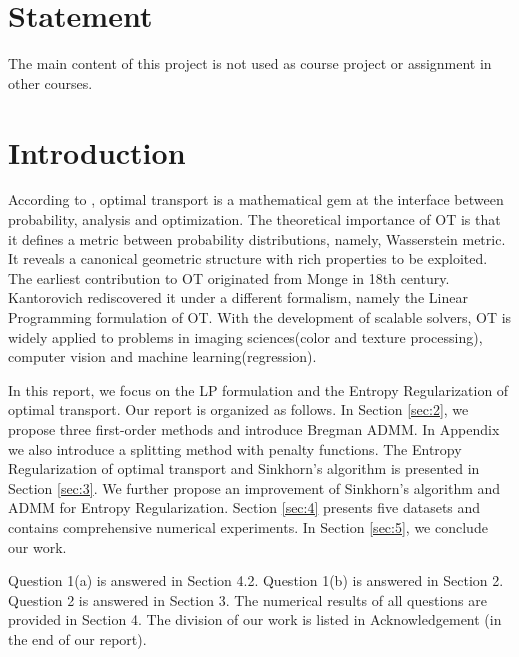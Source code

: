 \documentclass[english]{pkupaper}
\title{\titlemark}
\author{\authorthing}
\date{}
\begin{document}
\maketitle
\section*{Statement}
The main content of this project is not used as course project or assignment in other courses.

\section{Introduction}
According to \cite{COT}, optimal transport is a mathematical gem at the interface between probability, analysis and optimization. The theoretical importance of OT is that it defines a metric between probability distributions, namely, Wasserstein metric. It reveals a canonical geometric structure with rich properties to be exploited.  The earliest contribution to OT originated from Monge in 18th century. Kantorovich rediscovered it under a different formalism, namely the Linear Programming formulation of OT. With the development of scalable solvers, OT is widely applied to problems in imaging sciences(color and texture processing), computer vision and machine learning(regression).

In this report, we focus on the LP formulation and the Entropy Regularization of optimal transport. Our report is organized as follows. In Section \ref{sec:2}, we propose three first-order methods and introduce Bregman ADMM. In Appendix we also introduce a splitting method with penalty functions. The Entropy Regularization of optimal transport and Sinkhorn's algorithm is presented in Section \ref{sec:3}. We further propose an improvement of Sinkhorn's algorithm and ADMM for Entropy Regularization. Section \ref{sec:4} presents five datasets and contains comprehensive numerical experiments. In Section \ref{sec:5}, we conclude our work. 

Question 1(a) is answered in Section 4.2. Question 1(b) is answered in Section 2. Question 2 is answered in Section 3. The numerical results of all questions are provided in Section 4. The division of our work is listed in Acknowledgement (in the end of our report).
\end{document}
